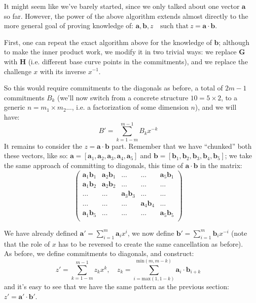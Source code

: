 \documentclass[10pt,a4paper]{article}
\begin{document}
It might seem like we've barely started, since we only talked about one
vector $\mathbf{a}$ so far. However, the power of the above algorithm extends almost
directly to the more general goal of proving knowledge of: $\textbf{a},\textbf{b},z \quad \textrm{such that} \ z = \textbf{a}\cdot\textbf{b}$.

First, one can repeat the exact algorithm above for the knowledge of $\mathbf{b}$;
although to make the inner product work, we modify it in two trivial
ways: we replace $\mathbf{G}$ with $\mathbf{H}$ (i.e. different base curve points in the commitments), and we replace the challenge $x$ with its inverse $x^{-1}$.

So this would require commitments to the diagonals as before, a total of $2m-1$
commitments $B_k$ (we'll now switch from a concrete structure $10=5\times 2$, to a generic $n = m_1 \times m_2 \ldots$,
i.e. a factorization of some dimension $n$), and we will have:
\[B' = \sum\limits_{k=1-m}^{m-1} B_k x^{-k}\]
It remains to consider the $z = \textbf{a}\cdot\textbf{b}$ part. Remember that we have ``chunked'' both
these vectors, like so: $\textbf{a} = [\textbf{a}_1, \textbf{a}_2,  \textbf{a}_3,  \textbf{a}_4,  \textbf{a}_5 ]$ and $\textbf{b} = [\textbf{b}_1, \textbf{b}_2,  \textbf{b}_3,  \textbf{b}_4,  \textbf{b}_5 ]$; we take the same approach of committing to
diagonals, this time of $\mathbf{a}\cdot \mathbf{b}$ in the matrix:
\[
\begin{pmatrix}
\textbf{a}_1\textbf{b}_1 & \textbf{a}_2\textbf{b}_1 & \dots & \dots & \textbf{a}_5\textbf{b}_1 \\
\textbf{a}_1\textbf{b}_2 &  \textbf{a}_2\textbf{b}_2& \dots & \dots & \dots \\
\dots & \dots & \textbf{a}_3\textbf{b}_3 & \dots & \dots \\
\dots & \dots & \dots & \textbf{a}_4\textbf{b}_4 & \dots  \\
\textbf{a}_1\textbf{b}_5 & \dots & \dots & \dots & \textbf{a}_5\textbf{b}_5 \\
\end{pmatrix}
\]

We have already defined $\textbf{a}' = \sum_{i=1}^{m}\textbf{a}_i x^i$, we now define 
$\textbf{b}' = \sum_{i=1}^{m}\textbf{b}_i x^{-i}$ (note that the role of $x$ has to be
reversed to create the same cancellation as before). As before, we
define commitments to diagonals, and construct:
\[z' = \sum\limits_{k=1-m}^{m-1} z_k x^k , \quad z_k = \sum\limits_{i=\textrm{max}(1, 1-k)}^{\textrm{min}(m, m-k)}\textbf{a}_i \cdot \textbf{b}_{i+k}\]
and it's easy to see that we have the same pattern as the previous
section: $z' = \textbf{a}' \cdot \textbf{b}'$.
\end{document}
